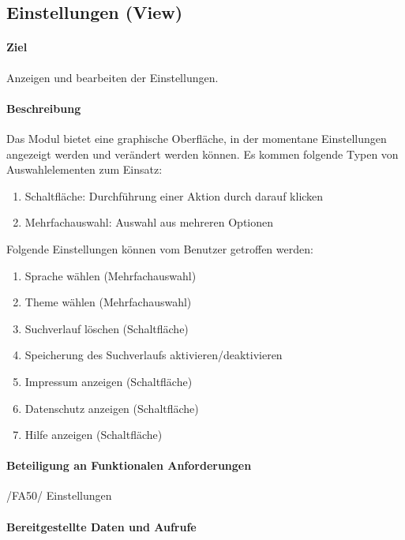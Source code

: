 \subsection{Einstellungen (View)}
\paragraph{Ziel}
Anzeigen und bearbeiten der Einstellungen.
\paragraph{Beschreibung}
Das Modul bietet eine graphische Oberfläche, in der momentane Einstellungen angezeigt werden und verändert werden können.
Es kommen folgende Typen von Auswahlelementen zum Einsatz:
\begin{enumerate}
    \item Schaltfläche: Durchführung einer Aktion durch darauf klicken
    \item Mehrfachauswahl: Auswahl aus mehreren Optionen
\end{enumerate}
Folgende Einstellungen können vom Benutzer getroffen werden:
\begin{enumerate}
    \item Sprache wählen (Mehrfachauswahl)
    \item Theme wählen (Mehrfachauswahl)
    \item Suchverlauf löschen (Schaltfläche)
    \item Speicherung des Suchverlaufs aktivieren/deaktivieren
    \item Impressum anzeigen (Schaltfläche)
    \item Datenschutz anzeigen (Schaltfläche)
    \item Hilfe anzeigen (Schaltfläche)
\end{enumerate}
\paragraph{Beteiligung an Funktionalen Anforderungen}
/FA50/ Einstellungen
\paragraph{Bereitgestellte Daten und Aufrufe}

